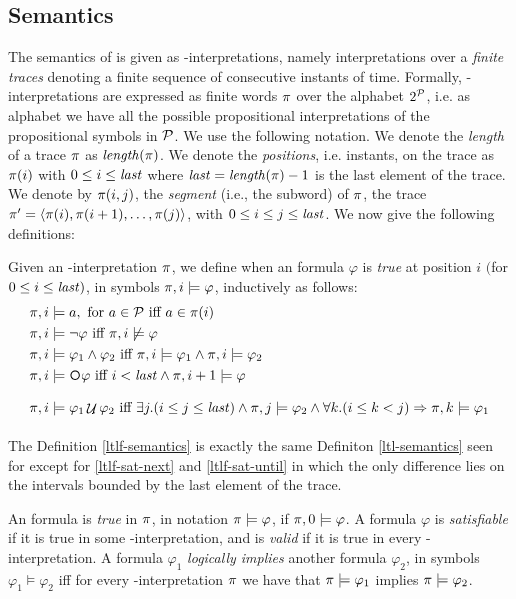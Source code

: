 \subsection{Semantics}
The semantics of \LTLf is given as \LT-interpretations, namely interpretations over a \emph{finite traces} denoting a finite sequence of consecutive instants of time. Formally, \LT-interpretations are expressed as finite words $\trace$ over the alphabet $2^\P$, i.e. as alphabet we have all the possible propositional interpretations of the propositional symbols in $\P$. We use the following notation. We denote the \emph{length} of a trace $\trace$ as $\length(\trace)$. We denote the \emph{positions}, i.e. instants, on the trace as $\trace(i)$ with $0 \le i \le \last$ where $\last = \length(\trace)-1$ is the last element of the trace. We denote by $\trace(i, j)$, the \emph{segment} (i.e., the subword) of $\trace$, the trace $\trace' = \tup{\trace(i), \trace(i+1), \dots, \trace(j)}$, with $0 \le i \le j \le \last$. We now give the following definitions:
\begin{definition}\label{ltlf-semantics}
Given an \LT-interpretation $\trace$, we define when an \LTLf formula $\varphi$ is \emph{true} at position $i$ $($for $0 \le i \le \last)$, in symbols $\trace, i \models \varphi$, inductively as follows:
\begin{align}
\trace, i &\models a, \tm{for} a\in\P \tiff a \in \trace(i)\nonumber\\
\trace, i &\models \lnot \varphi \tiff \trace, i \not\models \varphi\nonumber\\
\trace, i &\models \varphi_1 \lAND \varphi_2 \tiff \trace, i \models \varphi_1 \lAND \trace, i \models \varphi_2\nonumber\\
\trace, i &\models \Next\varphi \tiff i<\last \lAND \trace,i+1 \models \varphi \label{ltlf-sat-next}\\
\trace, i &\models \varphi_1 \lUntil \varphi_2 \tiff \exists j. (i\le j \le \last) \lAND \trace,j \models\varphi_2 \lAND  \forall k. (i\le k < j) \Rightarrow \trace, k \models \varphi_1 \label{ltlf-sat-until}
\end{align}
\end{definition}
The Definition \ref{ltlf-semantics} is exactly the same Definiton \ref{ltl-semantics} seen for \LTL except for \ref{ltlf-sat-next} and \ref{ltlf-sat-until} in which the only difference lies on the intervals bounded by the last element of the trace.
\begin{definition}\label{ltlf-sat-val-ent}
An \LTLf formula is \emph{true} in $\trace$, in notation $\trace \models \varphi$, if $\trace, 0 \models \varphi$. A formula $\varphi$ is \emph{satisfiable} if it is true in some \LT-interpretation, and is \emph{valid} if it is true in every \LT-interpretation. A formula $\varphi_1$ \emph{logically implies} another formula $\varphi_2$, in symbols $\varphi_1 \models \varphi_2$ iff for every \LT-interpretation $\trace$ we have that $\trace \models \varphi_1$ implies $ \trace \models \varphi_2$.
\end{definition}
